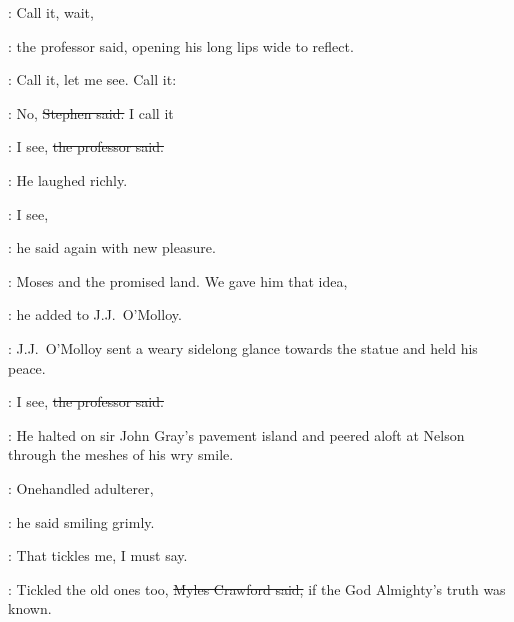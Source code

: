\machugh:
Call it, wait,

:
the professor said,
opening his long lips wide to
reflect.

\machugh:
Call it,
let me see.
Call it:

\Stephen:
No,
\sout{Stephen said.}
I call it

\machugh:
I see,
\sout{the professor said.}


:
He laughed richly.

\machugh:
I see,

:
he said again with new pleasure.

\machugh:
Moses and the promised land.
We gave him that idea,

:
he added to J.J.~O'Molloy.



:
J.J.~O'Molloy sent a weary sidelong glance towards the statue
and held his peace.

\machugh:
I see,
\sout{the professor said.}

:
He halted on sir John Gray's pavement island
and peered aloft at Nelson through the meshes of his wry smile.



\machugh:
Onehandled adulterer,

:
he said smiling grimly.

\machugh:
That tickles me, I must say.

\crawford:
Tickled the old ones too,
\sout{Myles Crawford said,}
if the God Almighty's truth was known.


